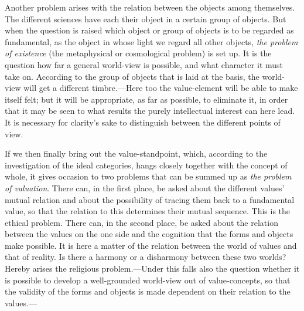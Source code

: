 \documentclass[12pt,a4paper]{book}
\newcommand{\opage}[1]{\marginnote{\footnotesize\textit{[#1]}}}
\begin{document}
Another problem arises with the relation between the objects among
themselves. The different sciences have each their object in a certain group
of objects. But when the question is raised which object or group of objects
is to be regarded as fundamental, as the object in whose light we regard all
other objects, \emph{the problem of existence} (the metaphysical or
cosmological problem) is set up. It is the question how far a general
world-view is possible, and what character it must take on. According to the
group of objects that is laid at the basis, the world-view will get a
different timbre.---Here too the value-element will be able to make itself
felt; but it will be appropriate, as far as possible, to eliminate it, in
order that it may be seen to what results the purely intellectual interest can
here lead. It is necessary for clarity's sake to distinguish between the
different points of view.

\opage{250}If we then finally bring out the value-standpoint, which, according to the
investigation of the ideal categories, hangs closely together with the concept
of whole, it gives occasion to two problems that can be summed up as \emph{the
problem of valuation}. There can, in the first place, be asked about the
different values' mutual relation and about the possibility of tracing them
back to a fundamental value, so that the relation to this determines their
mutual sequence. This is the ethical problem. There can, in the second place,
be asked about the relation between the values on the one side and the
cognition that the forms and objects make possible. It is here a matter of the
relation between the world of values and that of reality. Is there a harmony
or a disharmony between these two worlds? Hereby arises the religious
problem.---Under this falls also the question whether it is possible to
develop a well-grounded world-view out of value-concepts, so that the validity
of the forms and objects is made dependent on their relation to the values.---
\end{document}
